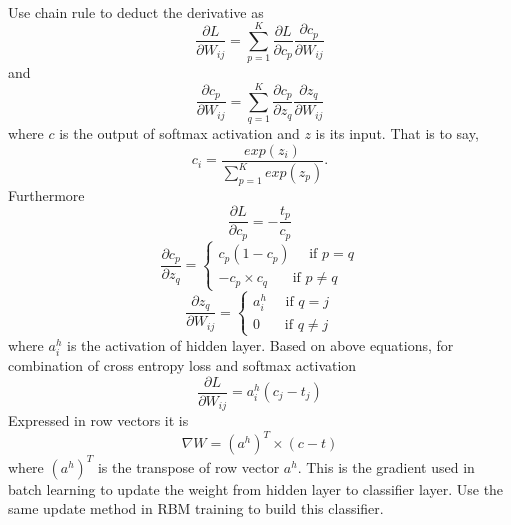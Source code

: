\documentclass[12pt]{article}
\begin{document}
\\
Use chain rule to deduct the derivative as\begin{equation}
\frac{\partial L}{\partial W_{ij}} = \sum_{p=1}^K \frac{\partial L}{\partial c_p} \frac{\partial c_p}{\partial W_{ij}}
\end{equation}
and \begin{equation}
\frac{\partial c_p}{\partial W_{ij}}= \sum_{q=1}^K \frac{\partial c_p}{\partial z_q} \frac{\partial z_q}{\partial W_{ij}}
\end{equation}
where $c$ is the output of softmax activation and $z$ is its input. That is to say, \begin{equation}
c_i = \frac{exp(z_i)}{\sum_{p=1}^K exp(z_p)}.
\end{equation} Furthermore\begin{equation}
\frac{\partial L}{\partial c_p} = -\frac{t_p}{c_p}
\end{equation}
\begin{equation}
\frac{\partial c_p}{\partial z_q} = \begin{cases}
c_p(1-c_p)~~~~~~\text{if } p = q
\\
-c_p\times c_q~~~~~~~~\text{if } p \neq q
\end{cases}
\end{equation}
\begin{equation}
\frac{\partial z_q}{\partial W_{ij}} = \begin{cases}
a^h_i~~~~~~\text{if } q = j
\\
0~~~~~~~~\text{if } q \neq j
\end{cases}
\end{equation}
where $a^h_i$ is the activation of hidden layer. Based on above equations, for combination of cross entropy loss and softmax activation \begin{equation}
\frac{\partial L}{\partial W_{ij}} = a_i^h(c_j - t_j)
\end{equation}
Expressed in row vectors it is \begin{equation}
\nabla W = (a^h)^T\times (c - t)
\end{equation}
where $(a^h)^T$ is the transpose of row vector $a^h$. This is the gradient used in batch learning to update the weight from hidden layer to classifier layer. Use the same update method in RBM training to build this classifier. 
\end{document}
